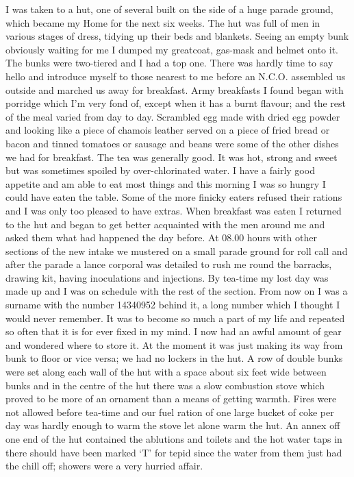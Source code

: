 I was taken to a hut, one of several built on the side of a huge
parade ground, which became my Home for the next six weeks. The hut
was full of men in various stages of dress, tidying up their beds and
blankets. Seeing an empty bunk obviously waiting for me I dumped my
greatcoat, gas-mask and helmet onto it. The bunks were two-tiered and
I had a top one. There was hardly time to say hello and introduce
myself to those nearest to me before an N.C.O. assembled us outside
and marched us away for breakfast. Army breakfasts I found began with
porridge which I'm very fond of, except when it has a burnt flavour;
and the rest of the meal varied from day to day. Scrambled egg made
with dried egg powder and looking like a piece of chamois leather
served on a piece of fried bread or bacon and tinned tomatoes or
sausage and beans were some of the other dishes we had for breakfast.
The tea was generally good. It was hot, strong and sweet but was
sometimes spoiled by over-chlorinated water. I have a fairly good
appetite and am able to eat most things and this morning I was so
hungry I could have eaten the table. Some of the more finicky eaters
refused their rations and I was only too pleased to have extras. When
breakfast was eaten I returned to the hut and began to get better
acquainted with the men around me and asked them what had happened the
day before. At 08.00 hours with other sections of the new intake we
mustered on a small parade ground for roll call and after the parade a
lance corporal was detailed to rush me round the barracks, drawing
kit, having inoculations and injections. By tea-time my lost day was
made up and I was on schedule with the rest of the section. From now
on I was a surname with the number 14340952 behind it, a long number
which I thought I would never remember. It was to become so much a
part of my life and repeated so often that it is for ever fixed in my
mind. I now had an awful amount of gear and wondered where to store
it. At the moment it was just making its way from bunk to floor or
vice versa; we had no lockers in the hut. A row of double bunks were
set along each wall of the hut with a space about six feet wide
between bunks and in the centre of the hut there was a slow combustion
stove which proved to be more of an ornament than a means of getting
warmth. Fires were not allowed before tea-time and our fuel ration of
one large bucket of coke per day was hardly enough to warm the stove
let alone warm the hut. An annex off one end of the hut contained the
ablutions and toilets and the hot water taps in there should have been
marked `T' for tepid since the water from them just had the chill off;
showers were a very hurried affair. 

